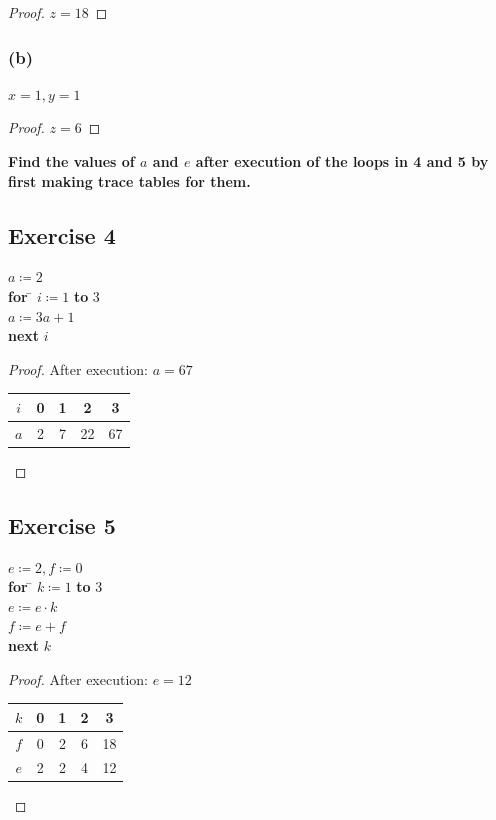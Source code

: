 \documentclass[14pt]{extarticle}
\newcommand{\cy}{\color{cyan}}
\begin{document}
\begin{proof}
$z = 18$
\end{proof}

\subsubsection{(b)}
$x = 1, y = 1$

\begin{proof}
$z = 6$
\end{proof}

{\bf \cy Find the values of $a$ and $e$ after execution of the loops in 4 and 5 by first making trace tables for them.}

\subsection{Exercise 4}
\begin{tabbing}
$a \coloneqq 2$ \\
{\bf for} \= $i \coloneqq 1$ {\bf to} 3 \\
          \> $a \coloneqq 3a + 1$ \\
{\bf next} $i$
\end{tabbing}

\begin{proof}
After execution: $a = 67$
\begin{center}
\begin{tabular}{|c|c|c|c|c|}
\hline
$i$ & 0 & 1 & 2 & 3 \\
\hline
$a$ & 2 & 7 & 22 & 67 \\
\hline
\end{tabular}
\end{center}
\end{proof}

\subsection{Exercise 5}
\begin{tabbing}
$e \coloneqq 2, f \coloneqq 0$ \\
{\bf for} \= $k \coloneqq 1$ {\bf to} 3 \\
          \> $e \coloneqq e \cdot k $ \\
          \> $f \coloneqq e + f$ \\
{\bf next} $k$
\end{tabbing}

\begin{proof}
After execution: $e = 12$
\begin{center}
\begin{tabular}{|c|c|c|c|c|}
\hline
$k$ & 0 & 1 & 2 & 3 \\
\hline
$f$ & 0 & 2 & 6 & 18 \\
\hline
$e$ & 2 & 2 & 4 & 12 \\
\hline
\end{tabular}
\end{center}
\end{proof}
\end{document}
